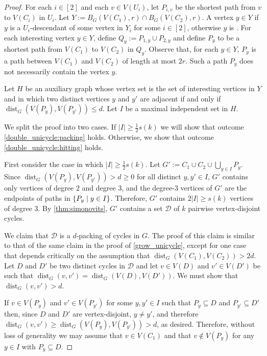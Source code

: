 \documentclass{patmorin}
\DeclareMathOperator{\dist}{dist}
\DeclarePairedDelimiter\set{\{}{\}}
\begin{document}
\begin{proof}
    For each $i\in[2]$ and each $v\in V(U_i)$, let $P_{i,v}$ be the shortest path from $v$ to $V(C_i)$ in $U_i$.     Let $Y:=B_G(V(C_1),r)\cap B_G(V(C_2),r)$. A vertex $y\in Y$  if $y$ is a $U_i$-descendant of some vertex in $Y_i$ for some $i\in[2]$,  otherwise $y$ is .  For each interesting vertex $y\in Y$, define $Q_y:= P_{1,y}\cup P_{2,y}$ and define $P_y$ to be a shortest path from $V(C_1)$ to $V(C_2)$ in $Q_y$.  Observe that, for each $y\in Y$, $P_y$ is a path between $V(C_1)$ and $V(C_2)$ of length at most $2r$.  Such a path $P_y$ does not necessarily contain the vertex $y$. 

    Let $H$ be an auxiliary graph whose vertex set is the set of interesting vertices in $Y$ and in which two distinct vertices $y$ and $y'$ are adjacent if and only if $\dist_G(V(P_y),V(P_{y'}))\leq d$.
    Let $I$ be a maximal independent set in $H$.

    We split the proof into two cases.  If 
    $|I|\geq \frac{1}{2}s(k)$ we will show that outcome \cref{double_unicycle:packing} holds.  Otherwise, we show that outcome \cref{double_unicycle:hitting} holds.

    First consider the case in which $|I|\ge\tfrac{1}{2}s(k)$.
    Let $G':=C_1\cup C_2\cup\bigcup_{y\in I}P_y$.
    Since $\dist_G(V(P_y),V(P_{y'}))>d\ge 0$ for all distinct $y,y'\in I$, $G'$ contains only vertices of degree $2$ and degree $3$, and the degree-$3$ vertices of $G'$ are the endpoints of paths in $\set{P_y\mid y\in I}$.
    Therefore, $G'$ contains $2|I|\geq s(k)$ vertices of degree $3$.
    By \cref{thm:simonovits}, $G'$ contains a set $\mathcal{D}$ of $k$ pairwise vertex-disjoint cycles.

    We claim that $\mathcal{D}$ is a $d$-packing of cycles in $G$. The proof of this claim is similar to that of the same claim in the proof of \cref{grow_unicycle}, except for one case that depends critically on the assumption that $\dist_G(V(C_1),V(C_2))>2d$.  Let $D$ and $D'$ be two distinct cycles in $\mathcal{D}$ and let $v\in V(D)$ and $v'\in V(D')$ be such that $\dist_G(v,v')=\dist_G(V(D),V(D'))$.  We must show that $\dist_G(v,v')>d$.


    If $v\in V(P_y)$ and $v'\in V(P_{y'})$ for some  $y,y' \in I$ such that $P_y\subseteq D$ and $P_{y'}\subseteq D'$ then, 
    since $D$ and $D'$ are vertex-disjoint, $y\neq y'$, and therefore 
    $\dist_G(v,v')\geq  \dist_G(V(P_y),V(P_{y'}))>d$, as desired.  Therefore, without loss of generality we may assume that $v\in V(C_1)$ and that $v\notin V(P_y)$ for any $y\in I$ with $P_y\subseteq D$.


\end{proof}
\end{document}
